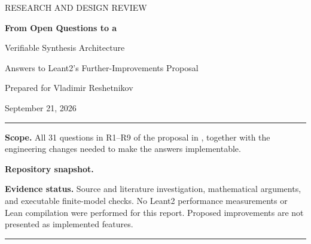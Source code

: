 \documentclass[11pt,a4paper]{article}
\newcommand{\code}[1]{\texttt{\detokenize{#1}}}
\theoremstyle{definition}
\theoremstyle{remark}
\begin{document}
\begin{titlepage}
\vspace*{16mm}
{\color{accent}\large\sffamily RESEARCH AND DESIGN REVIEW\par}
\vspace{8mm}
{\color{accent}\huge\bfseries From Open Questions to a\par Verifiable Synthesis Architecture\par}
\vspace{6mm}
{\Large Answers to Leant2's Further-Improvements Proposal\par}
\vspace{10mm}
{\large Prepared for Vladimir Reshetnikov\par}
{\large September 21, 2026\par}
\vspace{12mm}
\hrule
\vspace{5mm}
\textbf{Scope.} All 31 questions in R1--R9 of the proposal in
, together with the engineering changes needed to make the answers implementable.

\textbf{Repository snapshot.}\par
\code{784664ff34e819422510a4d470ab07fe48bb736b}

\textbf{Evidence status.} Source and literature investigation, mathematical arguments, and executable finite-model checks. No Leant2 performance measurements or Lean compilation were performed for this report. Proposed improvements are not presented as implemented features.
\vspace{5mm}
\hrule
\vfill
\begin{abstract}
This report answers the expert questions in Leant2's September 2026 improvement plan and converts them into a staged architecture. Several uncertainties have useful published answers: Smyth supports higher-order examples and does not require trace-complete examples; Hoogle+ explicitly treats type classes by dictionary translation; Canonical demonstrates indexed recursion and generalized induction; AutoLifter addresses auxiliary-state synthesis; and container-based realizability analysis gives a principled starting point for polymorphic observations. Other questions require more carefully delimited guarantees. We separate correctness of accepted programs, preservation of solutions during pruning, bounded completeness, ranking optimality, and reproducibility. We give a constraint-component search model, admissible cost bounds, a sound finite-carrier exclusion test, typed and versioned observation caches, a conservative path to evaluation with holes, bounded motive enumeration, and a proof-producing realization interface for recursion. Counterexamples correct several tempting inferences: reverse is an ordinary fold into lists, the number of open goals is not an admissible general heuristic, and sorting concurrent results does not make a wall-clock search machine-independent. The final sections specify integration points, validation obligations, and an experimental plan without inventing speedups or model-accuracy figures.
\end{abstract}
\end{titlepage}
\end{document}
